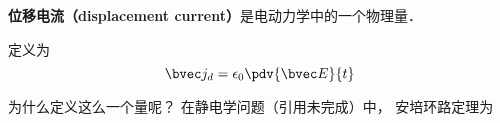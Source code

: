 
\begin{issues}
\issueDraft
\end{issues}


\textbf{位移电流（displacement current）}是电动力学中的一个物理量．

定义为
\begin{equation}
\bvec j_d = \epsilon_0 \pdv{\bvec E}{t}
\end{equation}

为什么定义这么一个量呢？ 在静电学问题（引用未完成）中， 安培环路定理为
